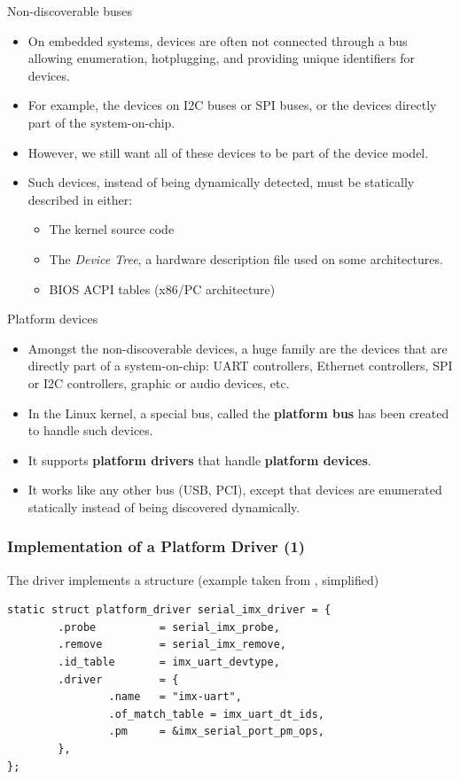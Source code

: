 \begin{frame}{Non-discoverable buses}
  \begin{itemize}
  \item On embedded systems, devices are often not connected through a
    bus allowing enumeration, hotplugging, and providing unique
    identifiers for devices.
  \item For example, the devices on I2C buses or SPI buses, or the
    devices directly part of the system-on-chip.
  \item However, we still want all of these devices to be part of the
    device model.
  \item Such devices, instead of being dynamically detected, must be
    statically described in either:
    \begin{itemize}
    \item The kernel source code
    \item The {\em Device Tree}, a hardware description file used on
      some architectures.
    \item BIOS ACPI tables (x86/PC architecture)
    \end{itemize}
  \end{itemize}
\end{frame}

\begin{frame}{Platform devices}
  \begin{itemize}
  \item Amongst the non-discoverable devices, a huge family are the
    devices that are directly part of a system-on-chip: UART
    controllers, Ethernet controllers, SPI or I2C controllers, graphic
    or audio devices, etc.
  \item In the Linux kernel, a special bus, called the {\bf platform
      bus} has been created to handle such devices.
  \item It supports {\bf platform drivers} that handle {\bf platform
      devices}.
  \item It works like any other bus (USB, PCI), except that devices
    are enumerated statically instead of being discovered dynamically.
  \end{itemize}
\end{frame}

\begin{frame}[fragile]
  \frametitle{Implementation of a Platform Driver (1)}
  The driver implements a 
  structure (example taken from ,
  simplified)
  \begin{block}{}
  \begin{verbatim}
static struct platform_driver serial_imx_driver = {
        .probe          = serial_imx_probe,
        .remove         = serial_imx_remove,
        .id_table       = imx_uart_devtype,
        .driver         = {
                .name   = "imx-uart",
                .of_match_table = imx_uart_dt_ids,
                .pm     = &imx_serial_port_pm_ops,
        },
};
\end{verbatim}
\end{block}
\end{frame}


